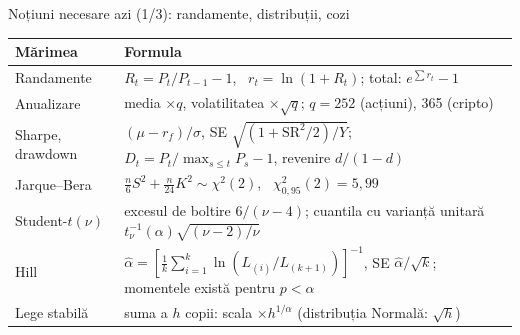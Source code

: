 \begin{frame}{Noțiuni necesare azi (1/3): randamente, distribuții, cozi}
\itemsize{\small}
{\renewcommand{\arraystretch}{1.3}\begin{center}
\footnotesize
\begin{tabular}{ll}
\toprule
\textbf{Mărimea} & \textbf{Formula} \\
\midrule
Randamente & $R_t = P_t/P_{t-1} - 1$, \ $r_t = \ln(1 + R_t)$; total: $e^{\sum r_t} - 1$ \\
Anualizare & media $\times q$, volatilitatea $\times \sqrt{q}$; $q = 252$ (acțiuni), 365 (cripto) \\
Sharpe, drawdown & $(\mu - r_f)/\sigma$, SE $\sqrt{(1 + \mathrm{SR}^2/2)/Y}$; \ $D_t = P_t/\max_{s \le t}P_s - 1$, revenire $d/(1 - d)$ \\
Jarque--Bera & $\frac{n}{6}S^2 + \frac{n}{24}K^2 \sim \chi^2(2)$, \ $\chi^2_{0{,}95}(2) = 5{,}99$ \\
Student-$t(\nu)$ & excesul de boltire $6/(\nu - 4)$; cuantila cu varianță unitară $t_\nu^{-1}(\alpha)\sqrt{(\nu - 2)/\nu}$ \\
Hill & $\hat\alpha = [\frac1k\sum_{i=1}^k \ln(L_{(i)}/L_{(k+1)})]^{-1}$, SE $\hat\alpha/\sqrt{k}$; momentele există pentru $p < \alpha$ \\
Lege stabilă & suma a $h$ copii: scala $\times h^{1/\alpha}$ (distribuția Normală: $\sqrt{h}$) \\
\bottomrule
\end{tabular}
\end{center}
}
\end{frame}

